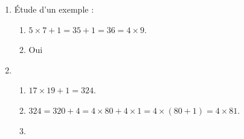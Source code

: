 
\medskip
 
%
 
\begin{enumerate}
\item Étude d'un exemple :
 
	\begin{enumerate}
		\item %
$5 \times 7 + 1 = 35 + 1 = 36 = 4 \times 9$.
		\item %
		Oui	
	\end{enumerate} 
\item %


	\begin{enumerate}
		\item %
		$17 \times 19 + 1 = 324$. 
		\item %
$324 = 320 + 4 = 4 \times 80 + 4\times 1 = 4 \times (80 + 1) = 4 \times 81$.
		\item %


\end{enumerate}
\end{enumerate}
